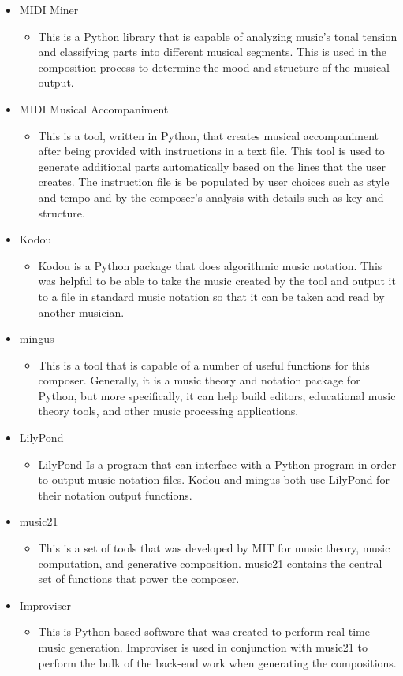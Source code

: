 \begin{itemize}
	\item MIDI Miner
	\begin{itemize}
		\item This is a Python library that is capable of analyzing music's tonal tension and classifying parts into different musical segments.  This is used in the composition process to determine the mood and structure of the musical output.
	\end{itemize}
	\item MIDI Musical Accompaniment
	\begin{itemize}
		\item This is a tool, written in Python, that creates musical accompaniment after being provided with instructions in a text file.  This tool is used to generate additional parts automatically based on the lines that the user creates.  The instruction file is be populated by user choices such as style and tempo and by the composer's analysis with details such as key and structure.
	\end{itemize}
	\item Kodou
	\begin{itemize}
		\item Kodou is a Python package that does algorithmic music notation.  This was helpful to be able to take the music created by the tool and output it to a file in standard music notation so that it can be taken and read by another musician.
	\end{itemize}
	\item mingus
	\begin{itemize}
		\item This is a tool that is capable of a number of useful functions for this composer.  Generally, it is a music theory and notation package for Python, but more specifically, it can help build editors, educational music theory tools, and other music processing applications.
	\end{itemize}
	\item LilyPond
	\begin{itemize}
		\item LilyPond Is a program that can interface with a Python program in order to output music notation files.  Kodou and mingus both use LilyPond for their notation output functions.
	\end{itemize}
	\item music21
	\begin{itemize}
		\item This is a set of tools that was developed by MIT for music theory, music computation, and generative composition.  music21 contains the central set of functions that power the composer.
	\end{itemize}
	\item Improviser
	\begin{itemize}
		\item This is Python based software that was created to perform real-time music generation.  Improviser is used in conjunction with music21 to perform the bulk of the back-end work when generating the compositions.
	\end{itemize}
\end{itemize}